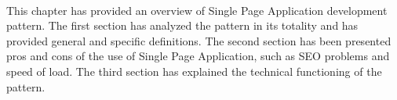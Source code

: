 \paragraph{}
This chapter has provided an overview of Single Page Application development pattern. The first section has analyzed the pattern in its totality and has provided general and specific definitions. The second section has been presented pros and cons of the use of Single Page Application, such as SEO problems and speed of load. The third section has explained the technical functioning of the pattern. 